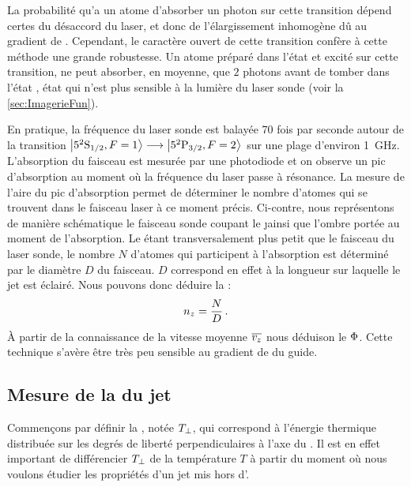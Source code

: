 {
La probabilité qu'a un atome d'absorber un photon sur cette transition dépend certes du désaccord du laser, et donc de l'élargissement inhomogène dû au gradient de \chm. Cependant, le caractère ouvert de cette transition confère à cette méthode une grande robustesse. Un atome préparé dans l'état  et excité sur cette transition, ne peut absorber, en moyenne, que $2$ photons avant de tomber dans l'état , état qui n'est plus sensible à la lumière du laser sonde (voir la \autoref{sec:ImagerieFun}).
}	

En pratique, la fréquence du laser sonde est balayée 70 fois par seconde autour de la transition ${{{\left| {{5^2 {\rm S}_{{1}/{2}}}, F=1 } \right\rangle}} \longrightarrow {{\left| {{\ensuremath{5^2 {\rm P}_{{3}/{2}}}}, F=2 } \right\rangle}}}$ sur une plage d'environ \SI{1}{\giga\hertz}. L'absorption du faisceau est mesurée par une photodiode et on observe un pic d'absorption au moment où la fréquence du laser passe à résonance. La mesure de l'aire du pic d'absorption permet de déterminer le nombre d'atomes qui se trouvent dans le faisceau laser à ce moment précis.%
\vspace{0.2cm}
Ci-contre, nous représentons de manière schématique le faisceau sonde coupant le \j ainsi que l'ombre portée au moment de l'absorption. Le \jat étant transversalement plus petit que le faisceau du laser sonde, le nombre $N$ d'atomes qui participent à l'absorption est déterminé par le diamètre $D$ du faisceau. $D$ correspond en effet à la longueur sur laquelle le jet est éclairé. Nous pouvons donc déduire la \datlin:
\[
n_z=\frac{N}{D}
\, .
\]
\`A partir de la connaissance de la vitesse moyenne ${\overline{v_z}}$ nous déduison le \fat ${\Phi}$.  
Cette technique s'avère être très peu sensible au gradient de \chm du guide.


\casse


\subsection{Mesure de la \tempt du jet}\label{sec:MesureTempTrans}
Commençons par définir la \emph{\tempt}, notée $T_{\bot}$, %
%
qui correspond à l'énergie thermique distribuée sur les degrés de liberté perpendiculaires à l'axe du \gm. Il est en effet important de différencier $T_{\bot}$ de la température $T$ à partir du moment où nous voulons étudier les propriétés d'un jet mis hors d'\eqthdy.

